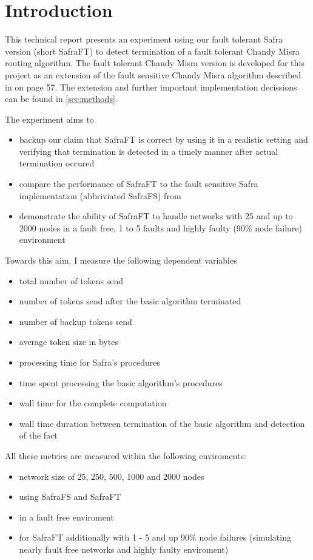 \section{Introduction} 
This technical report presents an experiment using our fault tolerant Safra version (short SafraFT) \cite{ourpaper}
  to detect termination of a fault tolerant Chandy Misra routing algorithm.
 The fault tolerant Chandy Misra version is developed for this project as an extension of the fault sensitive Chandy Misra algorithm described in \cite{fokkink,2018} on page 57.
 The extension and further important implementation decissions can be found in \cref{sec:methods}.
 
The experiment aims to
\begin{itemize}
	\item backup our claim that SafraFT is correct by using it in a realistic setting and verifying that termination is detected in a timely manner after actual termination occured
	\item compare the performance of SafraFT to the fault sensitive Safra implementation (abbriviated SafraFS) from \cite{safraPaper}
	\item demonstrate the ability of SafraFT to handle networks with 25 and up to 2000 nodes in a fault free, 1 to 5 faults and highly faulty (90\% node failure) environment
\end{itemize}

Towards this aim, I measure the following dependent variables
\begin{itemize}
	\item total number of tokens send
	\item number of tokens send after the basic algorithm terminated
	\item number of backup tokens send
	\item average token size in bytes
	\item processing time for Safra's procedures
	\item time spent processing the basic algorithm's procedures 
	\item wall time for the complete computation
	\item wall time duration between termination of the basic algorithm and detection of the fact
\end{itemize} 

All these metrics are measured within the following enviroments:
\begin{itemize}
	\item network size of 25, 250, 500, 1000 and 2000 nodes
	\item using SafraFS and SafraFT
	\item in a fault free enviroment
	\item for SafraFT additionally with 1 - 5 and up 90\% node failures (simulating nearly fault free networks and highly faulty enviroment)
\end{itemize}

